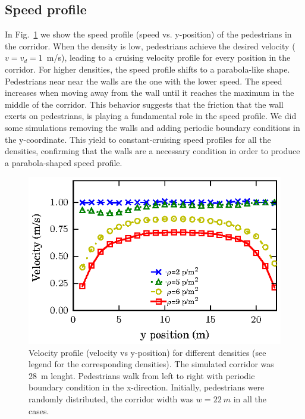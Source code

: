 \subsection{Speed profile}

In Fig.~\ref{speed-profile-w22} we show the speed profile (speed vs. y-position) of the pedestrians in the  corridor. When the density is low, pedestrians achieve the desired velocity ($v=v_d=1$~m/s), leading to a cruising velocity profile for every position in the corridor. For higher densities, the speed profile shifts to a parabola-like shape. Pedestrians near near the walls are the one with the lower speed. The speed increases when moving away from the wall until it reaches the maximum in the middle of the corridor. This behavior suggests that the friction that the wall exerts on pedestrians, is playing a fundamental role in the speed profile. We did some simulations removing the walls and adding periodic boundary conditions in the y-coordinate. This yield to constant-cruising speed profiles for all the densities, confirming that the walls are a necessary condition in order to produce a parabola-shaped speed profile.



\begin{figure}[htbp!]
\includegraphics[width=\columnwidth]
{plots/v(y)_width22_k24.eps}
\caption{\label{speed-profile-w22} Velocity profile (velocity vs y-position) for different densities (see legend for the corresponding densities). The simulated corridor was 28~m lenght. Pedestrians walk from left to right with periodic boundary condition in the x-direction. Initially, pedestrians were randomly distributed, the corridor width was $w = 22~m$ in all the cases. }
\end{figure}

